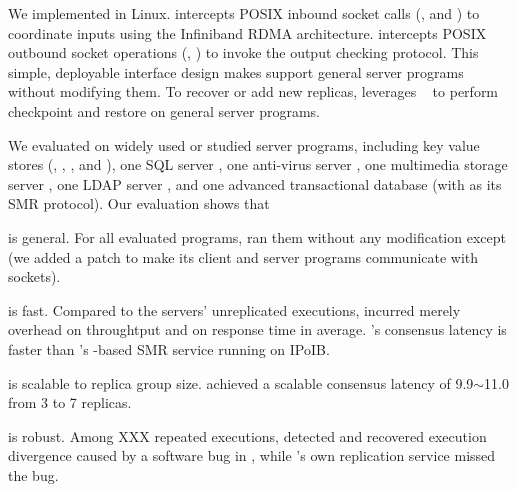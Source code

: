 We implemented \xxx in Linux. \xxx intercepts POSIX inbound socket calls 
(\eg, \accept and \recv) to coordinate inputs using the Infiniband 
RDMA architecture. \xxx intercepts POSIX outbound socket operations (\eg, 
\send) to invoke the output checking protocol. This simple, deployable 
interface design makes \xxx support general server programs without modifying 
them. To recover or add new replicas, \xxx leverages \criu~\cite{criu} to 
perform checkpoint and restore on general server programs.

We evaluated \xxx on \nprog widely used or studied server programs, including 
\nkvprog key value stores (\redis, \memcached, \ssdb, and \mongodb), one SQL 
server \mysql, one anti-virus server \clamav, one multimedia storage server 
\mediatomb, one LDAP server \openldap, and one advanced transactional database 
\calvin (with \zookeeper as its SMR protocol). Our evaluation shows that

\begin{tightenum}
\item \xxx is general. For all evaluated programs, \xxx ran them without any 
modification except \calvin (we added a \nlinescalvin patch to make its client 
and server programs communicate with sockets).

\item \xxx is fast. Compared to the \nprog servers' unreplicated executions, 
\xxx incurred merely \tputoverhead overhead on throughtput and \latencyoverhead 
on response time in average. \xxx's consensus latency is \fasterthanzookeeper 
faster than \calvin's \zookeeper-based SMR service running on IPoIB.

\item \xxx is scalable to replica group size. \xxx achieved a scalable 
consensus latency of 9.9$\sim$11.0 \us from 3 to 7 replicas.

\item \xxx is robust. Among XXX repeated executions, \xxx detected and 
recovered execution divergence caused by a software bug in \redis, while 
\redis's own replication service missed the bug.


\end{tightenum}  

